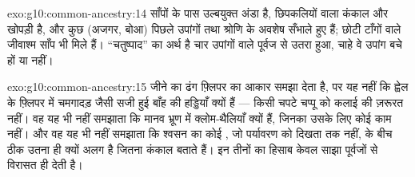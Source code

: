 \begin{solution}{exo:g10:common-ancestry:14}
साँपों के पास उल्बयुक्त अंडा है, छिपकलियों वाला कंकाल और खोपड़ी है, और
कुछ (अजगर, बोआ) पिछले उपांगों तथा श्रोणि के अवशेष सँभाले हुए हैं; छोटी
टाँगों वाले जीवाश्म साँप भी मिले हैं। ``चतुष्पाद'' का अर्थ है चार उपांगों
वाले पूर्वज से उतरा हुआ, चाहे वे उपांग बचे हों या नहीं।
\end{solution}

\begin{solution}{exo:g10:common-ancestry:15}
जीने का ढंग फ़्लिपर का आकार समझा देता है, पर यह नहीं कि ह्वेल के
फ़्लिपर में चमगादड़ जैसी सजी हुई बाँह की हड्डियाँ क्यों हैं --- किसी
चपटे चप्पू को कलाई की ज़रूरत नहीं। वह यह भी नहीं समझाता कि मानव भ्रूण
में क्लोम-थैलियाँ क्यों हैं, जिनका उसके लिए कोई काम नहीं। और वह यह भी
नहीं समझाता कि श्वसन का कोई , जो पर्यावरण को दिखता तक नहीं,
 के बीच ठीक उतना ही क्यों अलग है जितना कंकाल बताते हैं। इन
तीनों का हिसाब केवल साझा पूर्वजों से विरासत ही देती है।
\end{solution}

